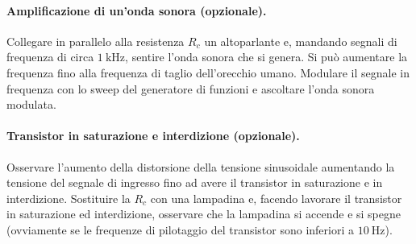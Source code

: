 \paragraph{Amplificazione di un'onda sonora (opzionale).} Collegare in parallelo alla resistenza $R_c$ un altoparlante e, mandando segnali di frequenza di circa $\SI{1}{\kilo\hertz}$, sentire l'onda sonora che si genera. Si può aumentare la frequenza fino alla frequenza di taglio dell'orecchio umano. Modulare il segnale in frequenza con lo sweep del generatore di funzioni e ascoltare l'onda sonora modulata.

\paragraph{Transistor in saturazione e interdizione (opzionale).} Osservare l'aumento della distorsione della tensione sinusoidale aumentando la tensione del segnale di ingresso fino ad avere il transistor in saturazione e in interdizione. Sostituire la $R_c$ con una lampadina e, facendo lavorare il transistor in saturazione ed interdizione, osservare che la lampadina si accende e si spegne (ovviamente se le frequenze di pilotaggio del transistor sono inferiori a $\SI{10}{\hertz}$).